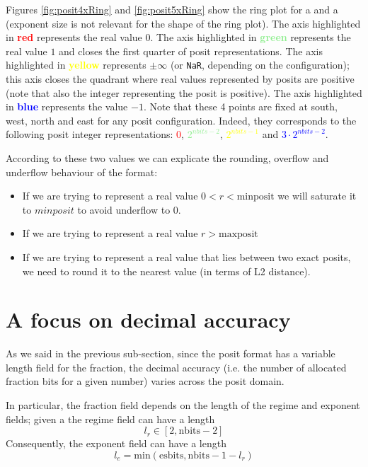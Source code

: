 Figures \ref{fig:posit4xRing} and \ref{fig:posit5xRing} show the ring plot for a  and a  (exponent size is not relevant for the shape of the ring plot). The axis highlighted in \textbf{\textcolor{red}{red}} represents the real value $0$. The axis highlighted in \textbf{\textcolor{lightgreen}{green}} represents the real value $1$ and closes the first quarter of posit representations. The axis highlighted in \textbf{\textcolor{yellow}{yellow}} represents $\pm \infty$ (or \texttt{NaR}, depending on the configuration); this axis closes the quadrant where real values represented by posits are positive (note that also the integer representing the posit is positive). The axis highlighted in \textbf{\textcolor{blue}{blue}} represents the value $-1$. Note that these 4 points are fixed at south, west, north and east for any posit configuration. Indeed, they corresponds to the following posit integer representations: \textcolor{red}{0}, \textcolor{lightgreen}{$2^{nbits-2}$}, \textcolor{yellow}{$2^{nbits - 1}$} and \textcolor{blue}{$3 \cdot 2^{nbits-2}$}.

According to these two values we can explicate the rounding, overflow and underflow behaviour of the format:
\begin{itemize}
    \item If we are trying to represent a real value $0 < r < \text{minposit}$ we will saturate it to $minposit$ to avoid underflow to $0$.
    \item If we are trying to represent a real value $r > \text{maxposit} $
    \item If we are trying to represent a real value that lies between two exact posits, we need to round it to the nearest value (in terms of L2 distance).
\end{itemize}




\section{A focus on decimal accuracy}

As we said in the previous sub-section, since the posit format has a variable length field for the fraction, the decimal accuracy (i.e. the number of allocated fraction bits for a given number) varies across the posit domain.

In particular, the fraction field depends on the length of the regime and exponent fields; given a  the regime field can have a length 
\[
l_r \in [2,\text{nbits}-2]
\]
Consequently, the exponent field can have a length 
\[
l_e = \text{min}(\text{esbits},\text{nbits}-1-l_r)
\]

